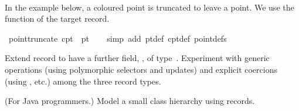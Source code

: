 \begin{isabellebody}
\ \ \isamarkupfalse%
%
\endisatagproof
{\isafoldproof}%
%
\isadelimproof
%
\endisadelimproof
%
\begin{isamarkuptext}%
In the example below, a coloured point is truncated to leave a
  point.  We use the  function of the target record.%
\end{isamarkuptext}%
\isamarkuptrue%
\isamarkupfalse%
\ {}point{}truncate\ cpt{}\ {}\ pt{}{}\isanewline
%
\isadelimproof
\ \ %
\endisadelimproof
%
\isatagproof
{}\isamarkupfalse%
\ {}simp\ add{}\ pt{}{}def\ cpt{}{}def\ point{}defs{}%
\endisatagproof
{\isafoldproof}%
%
\isadelimproof
%
\endisadelimproof
%
\begin{isamarkuptext}%
\begin{exercise}
  Extend record  to have a further field, , of type~.  Experiment with generic operations
  (using polymorphic selectors and updates) and explicit coercions
  (using ,  etc.) among the three record
  types.
  \end{exercise}

  \begin{exercise}
  (For Java programmers.)
  Model a small class hierarchy using records.
  \end{exercise}
\end{isamarkuptext}%
\isamarkuptrue%
%
\isadelimtheory
%
\endisadelimtheory
%
\isatagtheory
%
\endisatagtheory
{\isafoldtheory}%
%
\isadelimtheory
%
\endisadelimtheory
\end{isabellebody}%
